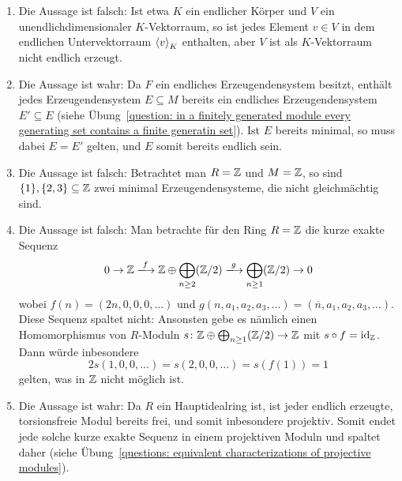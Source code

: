 \begin{solution}
\begin{enumerate}
    \item
      Die Aussage ist falsch:
      Ist etwa $K$ ein endlicher Körper und $V$ ein unendlichdimensionaler $K$-Vektorraum, so ist jedes Element $v \in V$ in dem endlichen Untervektorraum $\left\langle v \right\rangle_K$ enthalten, aber $V$ ist als $K$-Vektorraum nicht endlich erzeugt.
      
    \item
      Die Aussage ist wahr:
      Da $F$ ein endliches Erzeugendensystem besitzt, enthält jedes Erzeugendensystem $E \subseteq M$ bereits ein endliches Erzeugendensystem $E' \subseteq E$ (siehe Übung~\ref{question: in a finitely generated module every generating set contains a finite generatin set}).
      Ist $E$ bereits minimal, so muss dabei $E = E'$ gelten, und $E$ somit bereits endlich sein.
      
    \item
      Die Aussage ist falsch:
      Betrachtet man $R = \mathbb{Z}$ und $M = \mathbb{Z}$, so sind $\{1\}, \{2, 3\} \subseteq \mathbb{Z}$ zwei minimal Erzeugendensysteme, die nicht gleichmächtig sind.
      
    \item
      Die Aussage ist falsch:
      Man betrachte für den Ring $R = \mathbb{Z}$ die kurze exakte Sequenz
      \[
                            0
        \to                 \Integer
        \xlongrightarrow{f} \Integer \oplus \bigoplus_{n \geq 2} (\Integer/2)
        \xlongrightarrow{g} \bigoplus_{n \geq 1} (\Integer/2)
        \to                 0
      \]
      wobei $f(n) = (2n,0,0,0,\dotsc)$ und $g(n, a_1, a_2, a_3, \dotsc) = (\overline{n}, a_1, a_2, a_3, \dotsc)$.
      Diese Sequenz spaltet nicht:
      Ansonsten gebe es nämlich einen Homomorphismus von $R$-Moduln $s \colon \mathbb{Z} \oplus \bigoplus_{n \geq 1} (\mathbb{Z}/2) \to \mathbb{Z}$ mit $s \circ f = \operatorname{id}_{\mathbb{Z}}$.
      Dann würde inbesondere
      \[
          2 s(1,0,0,\dotsc)
        = s(2,0,0,\dotsc)
        = s(f(1))
        = 1
      \]
      gelten, was in $\mathbb{Z}$ nicht möglich ist.
      
    \item
      Die Aussage ist wahr:
      Da $R$ ein Hauptidealring ist, ist jeder endlich erzeugte, torsionsfreie Modul bereits frei, und somit inbesondere projektiv.
      Somit endet jede solche kurze exakte Sequenz in einem projektiven Moduln und spaltet daher (siehe Übung~\ref{questions: equivalent characterizations of projective modules}).
    

\end{enumerate}
\end{solution}
